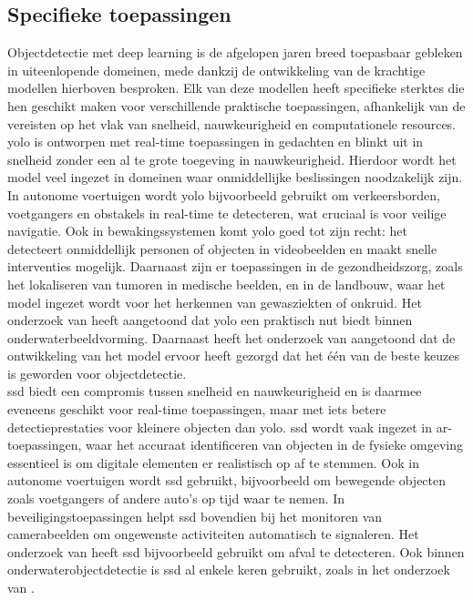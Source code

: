 \subsection{Specifieke toepassingen}

Objectdetectie met deep learning is de afgelopen jaren breed toepasbaar gebleken in uiteenlopende domeinen, mede dankzij de ontwikkeling van de krachtige modellen hierboven besproken. Elk van deze modellen heeft specifieke sterktes die hen geschikt maken voor verschillende praktische toepassingen, afhankelijk van de vereisten op het vlak van snelheid, nauwkeurigheid en computationele resources. \\

\gls{yolo} is ontworpen met real-time toepassingen in gedachten en blinkt uit in snelheid zonder een al te grote toegeving in nauwkeurigheid. Hierdoor wordt het model veel ingezet in domeinen waar onmiddellijke beslissingen noodzakelijk zijn. \autocite{Diwan_2022} In autonome voertuigen wordt \gls{yolo} bijvoorbeeld gebruikt om verkeersborden, voetgangers en obstakels in real-time te detecteren, wat cruciaal is voor veilige navigatie. Ook in bewakingssystemen komt \gls{yolo} goed tot zijn recht: het detecteert onmiddellijk personen of objecten in videobeelden en maakt snelle interventies mogelijk. Daarnaast zijn er toepassingen in de gezondheidszorg, zoals het lokaliseren van tumoren in medische beelden, en in de landbouw, waar het model ingezet wordt voor het herkennen van gewasziekten of onkruid. Het onderzoek van \textcite{Chen_2023} heeft aangetoond dat \gls{yolo} een praktisch nut biedt binnen onderwaterbeeldvorming. Daarnaast heeft het onderzoek van \textcite{Bochkovskiy_2020} aangetoond dat de ontwikkeling van het model ervoor heeft gezorgd dat het één van de beste keuzes is geworden voor objectdetectie. \\

\gls{ssd} biedt een compromis tussen snelheid en nauwkeurigheid en is daarmee eveneens geschikt voor real-time toepassingen, maar met iets betere detectieprestaties voor kleinere objecten dan \gls{yolo}. \autocite{Kumar_2020} \gls{ssd} wordt vaak ingezet in \gls{ar}-toepassingen, waar het accuraat identificeren van objecten in de fysieke omgeving essentieel is om digitale elementen er realistisch op af te stemmen. Ook in autonome voertuigen wordt \gls{ssd} gebruikt, bijvoorbeeld om bewegende objecten zoals voetgangers of andere auto's op tijd waar te nemen. In beveiligingstoepassingen helpt \gls{ssd} bovendien bij het monitoren van camerabeelden om ongewenste activiteiten automatisch te signaleren. Het onderzoek van \textcite{Ma_2020} heeft \gls{ssd} bijvoorbeeld gebruikt om afval te detecteren. Ook binnen onderwaterobjectdetectie is \gls{ssd} al enkele keren gebruikt, zoals in het onderzoek van \textcite{Jiang_2020}.

